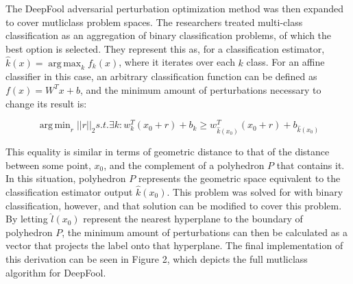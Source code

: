 \documentclass[../article.tex]{subfiles}
\DeclareMathOperator*{\argmin}{arg\,min}
\DeclareMathOperator*{\argmax}{arg\,max}
\begin{document}
The DeepFool adversarial perturbation optimization method was then expanded to cover mutliclass problem spaces. The researchers treated multi-class classification as an aggregation of binary classification problems, of which the best option is selected. They represent this as, for a classification estimator, $\hat{k}(x) = \argmax_{k} f_k(x)$, where it iterates over each $k$ class. For an affine classifier in this case, an arbitrary classification function can be defined as $f(x) = W^Tx + b$, and the minimum amount of perturbations necessary to change its result is:

\[\argmin_{r} ||r||_2 s.t. \exists k: w_k^T(x_0 + r) + b_k \geq w_{\hat{k}(x_0)}^T (x_0+r) + b_{\hat{k}(x_0)}\] 

This equality is similar in terms of geometric distance to that of the distance between some point, $x_0$, and the complement of a polyhedron $P$ that contains it. In this situation, polyhedron $P$ represents the geometric space equivalent to the classification estimator output $\hat{k}(x_0)$. This problem was solved for with binary classification, however, and that solution can be modified to cover this problem. By letting $\hat{l}(x_0)$ represent the nearest hyperplane to the boundary of polyhedron $P$, the minimum amount of perturbations can then be calculated as a vector that projects the label onto that hyperplane. The final implementation of this derivation can be seen in Figure 2, which depicts the full mutliclass algorithm for DeepFool.
\end{document}

